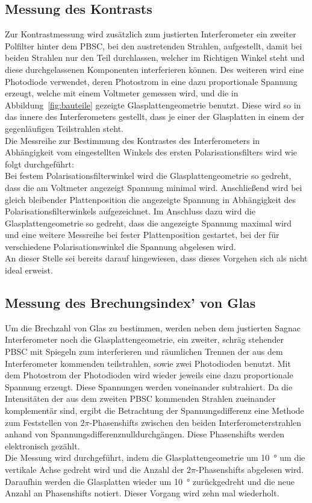 \subsection{Messung des Kontrasts}
%
Zur Kontrastmessung wird zusätzlich zum justierten Interferometer 
ein zweiter Polfilter hinter dem PBSC, bei den austretenden Strahlen, 
aufgestellt, damit bei beiden Strahlen nur den Teil durchlassen, 
welcher im Richtigen Winkel steht und diese durchgelassenen 
Komponenten interferieren können. Des weiteren wird eine 
Photodiode verwendet, deren Photostrom in eine dazu proportionale 
Spannung erzeugt, welche mit einem Voltmeter gemessen wird, und 
die in Abbildung~\ref{fig:bauteile} gezeigte Glasplattengeometrie 
benutzt. Diese wird so in das innere des Interferometers gestellt, 
dass je einer der Glasplatten in einem der gegenläufigen Teilstrahlen 
steht.\\
Die Messreihe zur Bestimmung des Kontrastes des Interferometers 
in Abhängigkeit vom eingestellten Winkels des ersten 
Polarisationsfilters wird wie folgt durchgeführt:\\
Bei festem Polarisationsfilterwinkel wird die Glasplattengeometrie 
so gedreht, dass die am Voltmeter angezeigt Spannung minimal wird. 
Anschließend wird bei gleich bleibender Plattenposition die 
angezeigte Spannung in Abhängigkeit des Polarisationsfilterwinkels 
aufgezeichnet.
Im Anschluss dazu wird die Glasplattengeometrie so gedreht, dass 
die angezeigte Spannung maximal wird und eine weitere 
Messreihe bei fester Plattenposition gestartet, bei der für 
verschiedene Polarisationswinkel die Spannung abgelesen wird.\\
An dieser Stelle sei bereits darauf hingewiesen, dass dieses Vorgehen 
sich als nicht ideal erweist.
%
\subsection{Messung des Brechungsindex' von Glas}
%
Um die Brechzahl von Glas zu bestimmen, werden neben dem 
justierten Sagnac Interferometer noch die Glasplattengeometrie, 
ein zweiter, schräg stehender PBSC mit Spiegeln zum interferieren und 
räumlichen Trennen der aus dem Interferometer kommenden teilstrahlen, 
sowie zwei Photodioden benutzt. Mit dem Photostrom der 
Photodioden wird wieder jeweils eine dazu proportionale 
Spannung erzeugt. Diese Spannungen werden voneinander subtrahiert. 
Da die Intensitäten der aus dem zweiten 
PBSC kommenden Strahlen zueinander komplementär sind, ergibt die 
Betrachtung der Spannungsdifferenz eine Methode zum Feststellen von 
$2\pi$-Phasenshifts zwischen den beiden Interferometerstrahlen anhand 
von Spannungsdifferenznulldurchgängen. Diese Phasenshifts werden 
elektronisch gezählt.\\
Die Messung wird durchgeführt, indem die Glasplattengeometrie um 
\SI{10}{\degree} um die vertikale Achse gedreht wird und die Anzahl 
der $2\pi$-Phasenshifts abgelesen wird. Daraufhin werden die 
Glasplatten wieder um \SI{10}{\degree} zurückgedreht und die neue 
Anzahl an Phasenshifts notiert. Dieser Vorgang wird zehn mal 
wiederholt.
%
